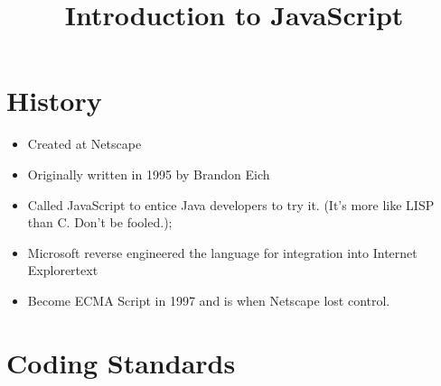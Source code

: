 \documentclass {amsart}
\title {Introduction to JavaScript}
\begin{document}
\maketitle

\section {History}

\begin{itemize}
	\item Created at Netscape
	\item Originally written in 1995 by Brandon Eich
	\item Called JavaScript to entice Java developers to try it.  (It's more like LISP than C.  Don't be fooled.);
	\item Microsoft reverse engineered the language for integration into Internet Explorertext
	\item Become ECMA Script in 1997 and is when Netscape lost control. 
\end{itemize}


\section{Coding Standards}
\end{document}

